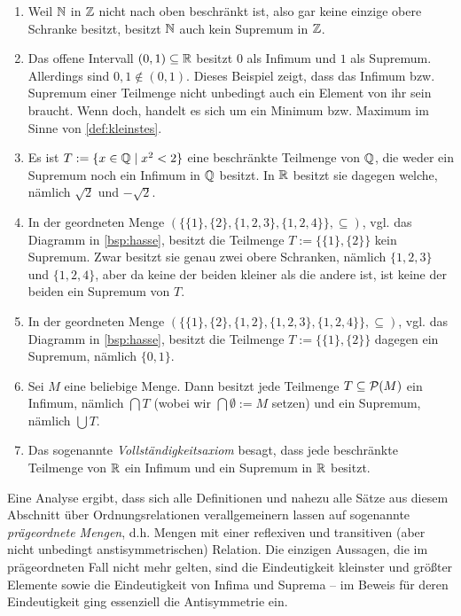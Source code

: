 \begin{bsp}
    \begin{enumerate}
        \item Weil $\mathbb N$ in $\mathbb Z$ nicht nach oben beschränkt ist, also gar keine einzige obere Schranke besitzt, besitzt $\mathbb N$ auch kein Supremum in $\mathbb Z$.
        \item Das offene Intervall $(0,1)\subseteq \mathbb R$ besitzt $0$ als Infimum und $1$ als Supremum. Allerdings sind $0,1\notin (0,1)$. Dieses Beispiel zeigt, dass das Infimum bzw. Supremum einer Teilmenge nicht unbedingt auch ein Element von ihr sein braucht. Wenn doch, handelt es sich um ein Minimum bzw. Maximum im Sinne von \cref{def:kleinstes}.
        \item Es ist $T:=\{x\in \mathbb Q \mid x^2 < 2\}$ eine beschränkte Teilmenge von $\mathbb Q$, die weder ein Supremum noch ein Infimum in $\mathbb Q$ besitzt. In $\mathbb R$ besitzt sie dagegen welche, nämlich $\sqrt{2}$ und $-\sqrt{2}$.
        \item In der geordneten Menge $(\{\{1\},\{2\},\{1,2,3\},\{1,2,4\}\},\subseteq)$, vgl. das Diagramm in \cref{bsp:hasse}, besitzt die Teilmenge $T:=\{\{1\},\{2\}\}$ kein Supremum. Zwar besitzt sie genau zwei obere Schranken, nämlich $\{1,2,3\}$ und $\{1,2,4\}$, aber da keine der beiden kleiner als die andere ist, ist keine der beiden ein Supremum von $T$.
        \item In der geordneten Menge $(\{\{1\},\{2\},\{1,2\},\{1,2,3\},\{1,2,4\}\},\subseteq)$, vgl. das Diagramm in \cref{bsp:hasse}, besitzt die Teilmenge $T:=\{\{1\},\{2\}\}$ dagegen ein Supremum, nämlich $\{0,1\}$.
        \item Sei $M$ eine beliebige Menge. Dann besitzt jede Teilmenge $T\subseteq \mathcal P(M)$ ein Infimum, nämlich $\bigcap T$ (wobei wir $\bigcap \emptyset:=M$ setzen) und ein Supremum, nämlich $\bigcup T$.
        \item Das sogenannte \emph{Vollständigkeitsaxiom} besagt, dass jede beschränkte Teilmenge von $\mathbb R$ ein Infimum und ein Supremum in $\mathbb R$ besitzt.
    \end{enumerate}
\end{bsp}


\begin{bem}
    Eine Analyse ergibt, dass sich alle Definitionen und nahezu alle Sätze aus diesem Abschnitt über Ordnungsrelationen verallgemeinern lassen auf sogenannte \emph{prägeordnete Mengen}, d.h. Mengen mit einer reflexiven und transitiven (aber nicht unbedingt anstisymmetrischen) Relation. Die einzigen Aussagen, die im prägeordneten Fall nicht mehr gelten, sind die Eindeutigkeit kleinster und größter Elemente sowie die Eindeutigkeit von Infima und Suprema -- im Beweis für deren Eindeutigkeit ging essenziell die Antisymmetrie ein.
\end{bem}





